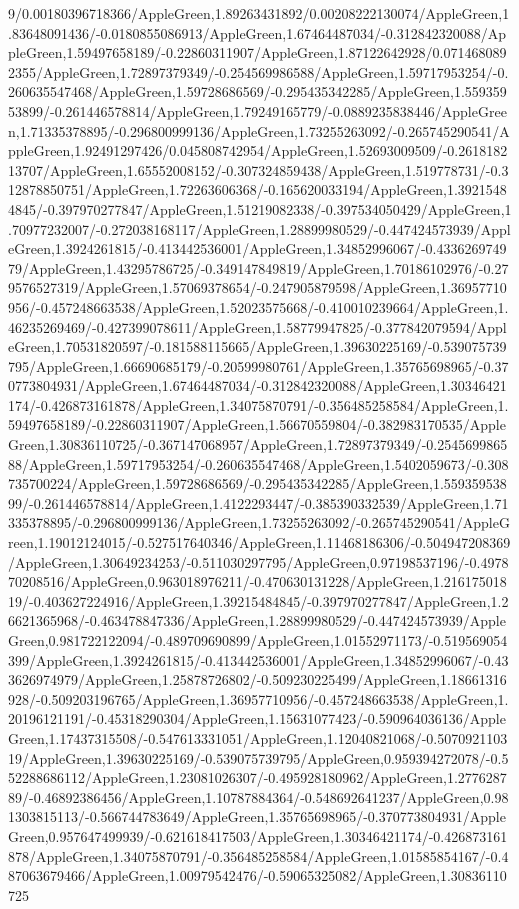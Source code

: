 {\begin{tikzternal}
9/0.00180396718366/AppleGreen,1.89263431892/0.00208222130074/AppleGreen,1.83648091436/-0.0180855086913/AppleGreen,1.67464487034/-0.312842320088/AppleGreen,1.59497658189/-0.22860311907/AppleGreen,1.87122642928/0.0714680892355/AppleGreen,1.72897379349/-0.254569986588/AppleGreen,1.59717953254/-0.260635547468/AppleGreen,1.59728686569/-0.295435342285/AppleGreen,1.55935953899/-0.261446578814/AppleGreen,1.79249165779/-0.0889235838446/AppleGreen,1.71335378895/-0.296800999136/AppleGreen,1.73255263092/-0.265745290541/AppleGreen,1.92491297426/0.045808742954/AppleGreen,1.52693009509/-0.261818213707/AppleGreen,1.65552008152/-0.307324859438/AppleGreen,1.519778731/-0.312878850751/AppleGreen,1.72263606368/-0.165620033194/AppleGreen,1.39215484845/-0.397970277847/AppleGreen,1.51219082338/-0.397534050429/AppleGreen,1.70977232007/-0.272038168117/AppleGreen,1.28899980529/-0.447424573939/AppleGreen,1.3924261815/-0.413442536001/AppleGreen,1.34852996067/-0.433626974979/AppleGreen,1.43295786725/-0.349147849819/AppleGreen,1.70186102976/-0.279576527319/AppleGreen,1.57069378654/-0.247905879598/AppleGreen,1.36957710956/-0.457248663538/AppleGreen,1.52023575668/-0.410010239664/AppleGreen,1.46235269469/-0.427399078611/AppleGreen,1.58779947825/-0.377842079594/AppleGreen,1.70531820597/-0.181588115665/AppleGreen,1.39630225169/-0.539075739795/AppleGreen,1.66690685179/-0.20599980761/AppleGreen,1.35765698965/-0.370773804931/AppleGreen,1.67464487034/-0.312842320088/AppleGreen,1.30346421174/-0.426873161878/AppleGreen,1.34075870791/-0.356485258584/AppleGreen,1.59497658189/-0.22860311907/AppleGreen,1.56670559804/-0.382983170535/AppleGreen,1.30836110725/-0.367147068957/AppleGreen,1.72897379349/-0.254569986588/AppleGreen,1.59717953254/-0.260635547468/AppleGreen,1.5402059673/-0.308735700224/AppleGreen,1.59728686569/-0.295435342285/AppleGreen,1.55935953899/-0.261446578814/AppleGreen,1.4122293447/-0.385390332539/AppleGreen,1.71335378895/-0.296800999136/AppleGreen,1.73255263092/-0.265745290541/AppleGreen,1.19012124015/-0.527517640346/AppleGreen,1.11468186306/-0.504947208369/AppleGreen,1.30649234253/-0.511030297795/AppleGreen,0.97198537196/-0.497870208516/AppleGreen,0.963018976211/-0.470630131228/AppleGreen,1.21617501819/-0.403627224916/AppleGreen,1.39215484845/-0.397970277847/AppleGreen,1.26621365968/-0.463478847336/AppleGreen,1.28899980529/-0.447424573939/AppleGreen,0.981722122094/-0.489709690899/AppleGreen,1.01552971173/-0.519569054399/AppleGreen,1.3924261815/-0.413442536001/AppleGreen,1.34852996067/-0.433626974979/AppleGreen,1.25878726802/-0.509230225499/AppleGreen,1.18661316928/-0.509203196765/AppleGreen,1.36957710956/-0.457248663538/AppleGreen,1.20196121191/-0.45318290304/AppleGreen,1.15631077423/-0.590964036136/AppleGreen,1.17437315508/-0.547613331051/AppleGreen,1.12040821068/-0.507092110319/AppleGreen,1.39630225169/-0.539075739795/AppleGreen,0.959394272078/-0.552288686112/AppleGreen,1.23081026307/-0.495928180962/AppleGreen,1.277628789/-0.46892386456/AppleGreen,1.10787884364/-0.548692641237/AppleGreen,0.981303815113/-0.566744783649/AppleGreen,1.35765698965/-0.370773804931/AppleGreen,0.957647499939/-0.621618417503/AppleGreen,1.30346421174/-0.426873161878/AppleGreen,1.34075870791/-0.356485258584/AppleGreen,1.01585854167/-0.487063679466/AppleGreen,1.00979542476/-0.59065325082/AppleGreen,1.30836110725
\end{tikzternal}}
